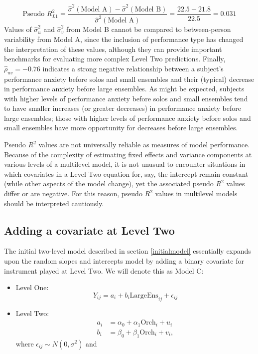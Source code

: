 \documentclass[
]{krantz}
\begin{document}
\begin{equation*}
\textrm{Pseudo }R^2_{L1} = \frac{\hat{\sigma}^{2}(\textrm{Model A})-\hat{\sigma}^{2}(\textrm{Model B})}{\hat{\sigma}^{2}(\textrm{Model A})} = \frac{22.5-21.8}{22.5} = 0.031
\end{equation*}
Values of \(\hat{\sigma}_{u}^{2}\) and \(\hat{\sigma}_{v}^{2}\) from Model B cannot be compared to between-person variability from Model A, since the inclusion of performance type has changed the interpretation of these values, although they can provide important benchmarks for evaluating more complex Level Two predictions. Finally, \(\hat{\rho}_{uv}=-0.76\) indicates a strong negative relationship between a subject's performance anxiety before solos and small ensembles and their (typical) decrease in performance anxiety before large ensembles. As might be expected, subjects with higher levels of performance anxiety before solos and small ensembles tend to have smaller increases (or greater decreases) in performance anxiety before large ensembles; those with higher levels of performance anxiety before solos and small ensembles have more opportunity for decreases before large ensembles.

Pseudo \(R^2\) values are not universally reliable as measures of model performance. Because of the complexity of estimating fixed effects and variance components at various levels of a multilevel model, it is not unusual to encounter situations in which covariates in a Level Two equation for, say, the intercept remain constant (while other aspects of the model change), yet the associated pseudo \(R^2\) values differ or are negative. For this reason, pseudo \(R^2\) values in multilevel models should be interpreted cautiously.

\hypertarget{modelc}{%
\subsection{Adding a covariate at Level Two}\label{modelc}}

The initial two-level model described in section \ref{initialmodel} essentially expands upon the random slopes and intercepts model by adding a binary covariate for instrument played at Level Two. We will denote this as Model C:

\begin{itemize}
\item
  Level One:
  \begin{equation*}
  Y_{ij} = a_{i}+b_{i}\textrm{LargeEns}_{ij}+\epsilon_{ij}
  \end{equation*}
\item
  Level Two:
  \begin{align*}
  a_{i} & = \alpha_{0}+\alpha_{1}\textrm{Orch}_{i}+u_{i} \\
  b_{i} & = \beta_{0}+\beta_{1}\textrm{Orch}_{i}+v_{i},
  \end{align*}
  where \(\epsilon_{ij}\sim N(0,\sigma^2)\) and
\end{itemize}
\end{document}

